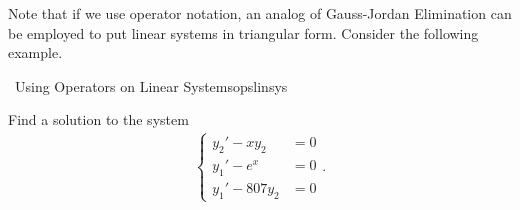     Note that if we use operator notation, an analog of Gauss-Jordan Elimination can be employed to put linear systems in triangular form. Consider the following example.
    \begin{example}{\Difficulty\,\Difficulty\,\,Using Operators on Linear Systems}{opslinsys}

        Find a solution to the system
        \begin{align*}
            \begin{cases}
                y_2'-xy_2&=0 \\
                y_1'-e^x&=0 \\
                y_1'-807y_2&=0
            \end{cases}.
        \end{align*}
        \DOTHISLATER
    \end{example}